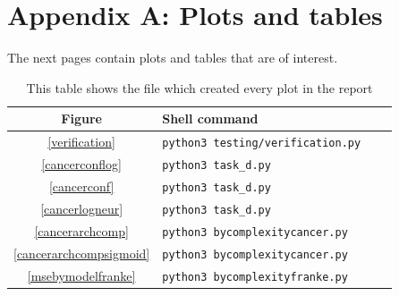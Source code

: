 \documentclass[onecolumn,10pt,cleanfoot]{asme2ej}
\begin{document}
\section*{Appendix A: Plots and tables}

The next pages contain plots and tables that are of interest.

\begin{table}
\caption{This table shows the file which created every plot in the report}
\begin{center}
\label{allparamstable}
\begin{tabular}{c | l l l}
Figure & Shell command \\
\hline
\ref{verification} & \texttt{python3 testing/verification.py}\\
\ref{cancerconflog} & \texttt{python3 task\_d.py}\\
\ref{cancerconf} & \texttt{python3 task\_d.py}\\
\ref{cancerlogneur} & \texttt{python3 task\_d.py}\\
\ref{cancerarchcomp} & \texttt{python3 bycomplexitycancer.py}\\
\ref{cancerarchcompsigmoid} & \texttt{python3 bycomplexitycancer.py}\\
\ref{msebymodelfranke} & \texttt{python3 bycomplexityfranke.py}\\
\hline
\end{tabular}
\end{center}
\end{table}
\end{document}
